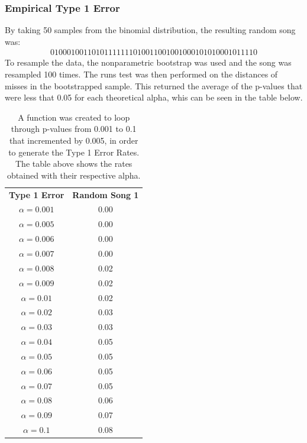 \documentclass[12pt, letterpaper]{article}
\begin{document}
\subsubsection{Empirical Type 1 Error} 
By taking 50 samples from the binomial distribution, the resulting random song was:
\begin{gather*}
  0 1 0 0 0 1 0 0 1 1 0 1 0 1 1 1 1 1 1 1 0 
  1 0 0 1 1 0 0 1 0 0 1 0 0 0 1 0 1 0 1 0 0
  0 1 0 1 1 1 1 0
\end{gather*} 
To resample the data, the nonparametric bootstrap was used and the song was resampled 100 times. The runs test was then performed on the distances of misses in the bootstrapped sample. This returned the average of the p-values that were less that 0.05 for each theoretical alpha, whis can be seen in the table below.
\begin{table}[t]
\begin{center}
\begin{tabular}{|c|c|}
\textbf{Type 1 Error} & \textbf{Random Song 1}\\
$\alpha = 0.001$ & 0.00\\
$\alpha = 0.005$ &  0.00\\
$\alpha = 0.006$ &  0.00\\
$\alpha = 0.007$ & 0.00\\
$\alpha = 0.008$ & 0.02\\
$\alpha = 0.009$ & 0.02\\
$\alpha = 0.01$ & 0.02\\
$\alpha = 0.02$ & 0.03\\
$\alpha = 0.03$ & 0.03\\
$\alpha = 0.04$ & 0.05\\
$\alpha = 0.05$ &  0.05\\
$\alpha = 0.06$ &  0.05\\
$\alpha = 0.07$ &  0.05\\
$\alpha = 0.08$ &  0.06\\
$\alpha = 0.09$ & 0.07\\
$\alpha = 0.1$ & 0.08 \\ 
\end{tabular}
\end{center}
\caption{A function was created to loop through p-values from 0.001 to 0.1 that incremented by 0.005, in order to  generate the Type 1 Error Rates. The table above shows the rates obtained with their respective alpha.}

\label{fig: Type 1 Error Rates for Nonparametric Bootstrap}
\end{table}
\end{document}
